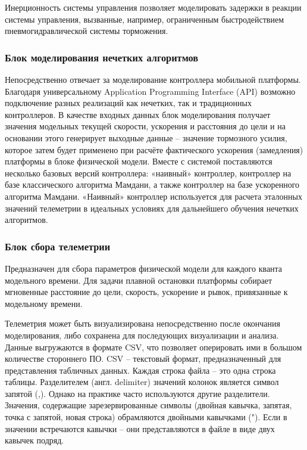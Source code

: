 Инерционность системы управления позволяет моделировать задержки в реакции системы управления, вызванные, например, ограниченным быстродействием пневмогидравлической системы торможения.

\subsubsection{Блок моделирования нечетких алгоритмов}

Непосредственно отвечает за моделирование контроллера мобильной платформы. Благодаря универсальному Application Programming Interface (API) возможно подключение разных реализаций как нечетких, так и традиционных контроллеров. В качестве входных данных блок моделирования получает значения модельных текущей скорости, ускорения и расстояния до цели и на основании этого генерирует выходные данные – значение тормозного усилия, которое затем будет применено при расчёте фактического ускорения (замедления) платформы в блоке физической модели. Вместе с системой поставляются несколько базовых версий контроллера: «наивный» контроллер, контроллер на базе классического алгоритма Мамдани, а также контроллер на базе ускоренного алгоритма Мамдани. «Наивный» контроллер используется для расчета эталонных значений телеметрии в идеальных условиях для дальнейшего обучения нечетких алгоритмов.

\subsubsection{Блок сбора телеметрии }

Предназначен для сбора параметров физической модели для каждого кванта модельного времени. Для задачи плавной остановки платформы собирает мгновенные расстояние до цели, скорость, ускорение и рывок, привязанные к модельному времени.

Телеметрия может быть визуализирована непосредственно после окончания моделирования, либо сохранена для последующих визуализации и анализа. Данные выгружаются в формате CSV, что позволяет оперировать ими в большом количестве стороннего ПО. CSV – текстовый формат, предназначенный для представления табличных данных. Каждая строка файла – это одна строка таблицы. Разделителем (англ. delimiter) значений колонок является символ запятой (,). Однако на практике часто используются другие разделители. Значения, содержащие зарезервированные символы (двойная кавычка, запятая, точка с запятой, новая строка) обрамляются двойными кавычками ("). Если в значении встречаются кавычки – они представляются в файле в виде двух кавычек подряд.
